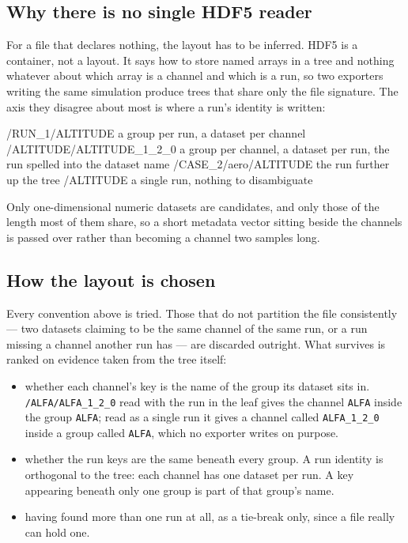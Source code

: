 \documentclass[11pt,a4paper,oneside]{report}
\newcommand{\code}[1]{\texttt{#1}}
\begin{document}
\subsection*{Why there is no single HDF5 reader}

For a file that declares nothing, the layout has to be inferred.
HDF5 is a container, not a layout. It says how to store named arrays in a tree
and nothing whatever about which array is a channel and which is a run, so two
exporters writing the same simulation produce trees that share only the file
signature. The axis they disagree about most is where a run's identity is
written:

\begin{aoecode}
/RUN_1/ALTITUDE            a group per run, a dataset per channel
/ALTITUDE/ALTITUDE_1_2_0   a group per channel, a dataset per run, the
                           run spelled into the dataset name
/CASE_2/aero/ALTITUDE      the run further up the tree
/ALTITUDE                  a single run, nothing to disambiguate
\end{aoecode}

Only one-dimensional numeric datasets are candidates, and only those of the
length most of them share, so a short metadata vector sitting beside the
channels is passed over rather than becoming a channel two samples long.

\subsection*{How the layout is chosen}

Every convention above is tried. Those that do not partition the file
consistently --- two datasets claiming to be the same channel of the same run,
or a run missing a channel another run has --- are discarded outright. What
survives is ranked on evidence taken from the tree itself:

\begin{itemize}
  \item whether each channel's key is the name of the group its dataset sits in.
        \code{/ALFA/ALFA\_1\_2\_0} read with the run in the leaf gives the
        channel \code{ALFA} inside the group \code{ALFA}; read as a single run
        it gives a channel called \code{ALFA\_1\_2\_0} inside a group called
        \code{ALFA}, which no exporter writes on purpose.
  \item whether the run keys are the same beneath every group. A run identity is
        orthogonal to the tree: each channel has one dataset per run. A key
        appearing beneath only one group is part of that group's name.
  \item having found more than one run at all, as a tie-break only, since a file
        really can hold one.
\end{itemize}
\end{document}
